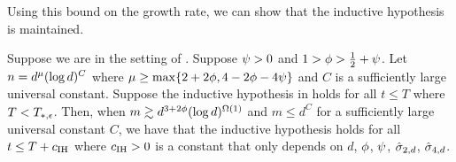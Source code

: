 Using this bound on the growth rate, we can show that the inductive hypothesis is maintained.

\begin{lemma}[IH is Maintained] \label{lemma:IH_is_maintained}
Suppose we are in the setting of . Suppose $\psi>0$ and $1 > \phi>\frac{1}{2}+\psi$. Let $n=d^{\mu} (\log d)^{C}$ where $\mu\geq\max\{2+2\phi, 4-2\phi-4\psi\}$ and $C$ is a sufficiently large universal constant. 
	Suppose the inductive hypothesis in  holds for all $t\le T$ where $T<T_{*, \epsilon}$.
	Then, when $m \gtrsim d^{3 + 2\phi} (\log d)^{\Omega(1)}$ and $m \leq d^C$ for a sufficiently large universal constant $C$, we have that the inductive hypothesis holds for all $t\le T+c_{\textup{IH}}$ where $c_{\textup{IH}}>0$ is a constant that only depends on $d$, $\phi$, $\psi$, $\hat{\sigma}_{2, d}$, $\hat{\sigma}_{4, d}$.
\end{lemma}
